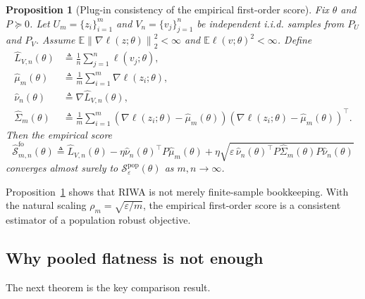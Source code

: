 \documentclass{article}
\newtheorem{proposition}{Proposition}
\newcommand{\EE}{\mathbb{E}}
\newcommand{\iid}{i.i.d.}
\newcommand{\riwa}{\textup{\textsc{RIWA}}}
\newcommand{\norm}[1]{\left\lVert #1 \right\rVert}
\begin{document}
\begin{proposition}[Plug-in consistency of the empirical first-order score]
\label{prop:consistency}
Fix $\theta$ and $P \succeq 0$. Let $U_m = \{z_i\}_{i=1}^{m}$ and $V_n = \{v_j\}_{j=1}^{n}$ be independent \iid{} samples from $P_U$ and $P_V$. Assume $\EE \norm{\nabla \ell(z;\theta)}_2^2 < \infty$ and $\EE \ell(v;\theta)^2 < \infty$. Define
\begin{align}
    \hat L_{V,n}(\theta) &\triangleq \frac{1}{n}\sum_{j=1}^{n}\ell(v_j;\theta),\\
    \hat \mu_m(\theta) &\triangleq \frac{1}{m}\sum_{i=1}^{m}\nabla \ell(z_i;\theta),\\
    \hat \nu_n(\theta) &\triangleq \nabla \hat L_{V,n}(\theta),\\
    \hat \Sigma_m(\theta) &\triangleq \frac{1}{m}\sum_{i=1}^{m}\left(\nabla \ell(z_i;\theta)-\hat \mu_m(\theta)\right)\left(\nabla \ell(z_i;\theta)-\hat \mu_m(\theta)\right)^\top.
\end{align}
Then the empirical score
\begin{equation}
    \hat{\mathcal{S}}_{m,n}^{\mathrm{fo}}(\theta)
    \triangleq
    \hat L_{V,n}(\theta)
    -
    \eta \hat \nu_n(\theta)^\top P \hat \mu_m(\theta)
    +
    \eta \sqrt{\varepsilon\, \hat \nu_n(\theta)^\top P \hat \Sigma_m(\theta) P \hat \nu_n(\theta)}
\end{equation}
converges almost surely to $\mathcal{S}_{\varepsilon}^{\mathrm{pop}}(\theta)$ as $m,n \to \infty$.
\end{proposition}

Proposition~\ref{prop:consistency} shows that \riwa{} is not merely finite-sample bookkeeping. With the natural scaling $\rho_m = \sqrt{\varepsilon/m}$, the empirical first-order score is a consistent estimator of a population robust objective.

\subsection{Why pooled flatness is not enough}

The next theorem is the key comparison result.
\end{document}
